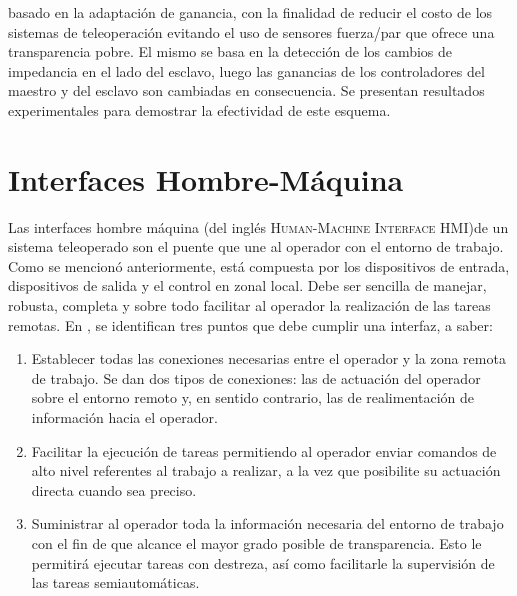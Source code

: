 basado en la adaptación de ganancia, con la finalidad de reducir el costo de los sistemas de teleoperación evitando el uso de sensores fuerza/par que ofrece una transparencia pobre. El mismo se basa en la detección de los cambios de impedancia en el lado del esclavo, luego las ganancias de los controladores del maestro y del esclavo son cambiadas en consecuencia. Se presentan resultados experimentales para demostrar la efectividad de este esquema.\\



\section{Interfaces Hombre-Máquina}
Las interfaces hombre m\'aquina (del ingl\'es \textsc{Human-Machine Interface HMI})de un sistema teleoperado son el puente que une al operador con el entorno de trabajo. Como se mencionó anteriormente, está compuesta por los dispositivos de entrada, dispositivos de salida y el control en zonal local. Debe ser sencilla de manejar, robusta, completa y sobre todo facilitar al operador la realización de las tareas remotas. En \cite{Ferre2007a}, se identifican tres puntos que debe cumplir una interfaz, a saber:

\begin{enumerate}
\item  Establecer todas las conexiones necesarias entre el operador y la zona remota de trabajo. Se dan dos tipos de conexiones: las de actuación del operador sobre el entorno remoto y, en sentido contrario, las de realimentación de información hacia el operador.

\item Facilitar la ejecución de tareas permitiendo al operador enviar comandos de alto nivel referentes al trabajo a realizar, a la vez que posibilite su actuación directa cuando sea preciso.

\item Suministrar al operador toda la información necesaria del entorno de trabajo con el fin de que alcance el mayor grado posible de transparencia. Esto le permitirá ejecutar tareas con destreza, así como facilitarle la supervisión de las tareas semiautomáticas.

\end{enumerate}

